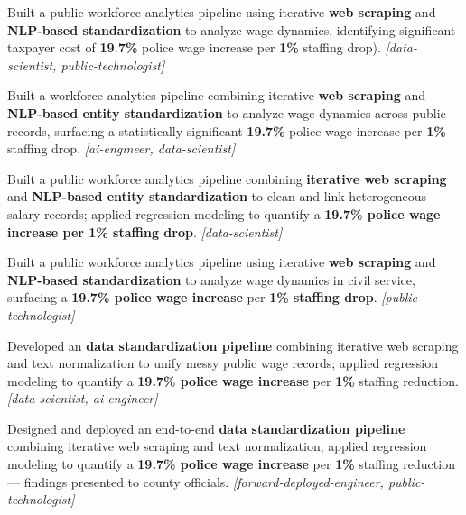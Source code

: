 \documentclass[letterpaper,11pt]{article}
\newcommand{\resumeItem}[1]{
  \item\small{
    {#1 \vspace{-3pt}}
  }
}
\begin{document}
                \resumeItem{Built a public workforce analytics pipeline using iterative \textbf{web scraping} and \textbf{NLP-based standardization} to analyze wage dynamics, identifying significant taxpayer cost of \textbf{19.7\%} police wage increase per \textbf{1\%} staffing drop). \textit{[data-scientist, public-technologist]}}
                \resumeItem{Built a workforce analytics pipeline combining iterative \textbf{web scraping} and \textbf{NLP-based entity standardization} to analyze wage dynamics across public records, surfacing a statistically significant \textbf{19.7\%} police wage increase per \textbf{1\%} staffing drop. \textit{[ai-engineer, data-scientist]}}
                \resumeItem{Built a public workforce analytics pipeline combining \textbf{iterative web scraping} and \textbf{NLP-based entity standardization} to clean and link heterogeneous salary records; applied regression modeling to quantify a \textbf{19.7\% police wage increase per 1\% staffing drop}. \textit{[data-scientist]}}
                \resumeItem{Built a public workforce analytics pipeline using iterative \textbf{web scraping} and \textbf{NLP-based standardization} to analyze wage dynamics in civil service, surfacing a \textbf{19.7\% police wage increase} per \textbf{1\% staffing drop}. \textit{[public-technologist]}}
                \resumeItem{Developed an \textbf{data standardization pipeline} combining iterative web scraping and text normalization to unify messy public wage records; applied regression modeling to quantify a \textbf{19.7\% police wage increase} per \textbf{1\%} staffing reduction. \textit{[data-scientist, ai-engineer]}}
                \resumeItem{Designed and deployed an end-to-end \textbf{data standardization pipeline} combining iterative web scraping and text normalization; applied regression modeling to quantify a \textbf{19.7\% police wage increase} per \textbf{1\%} staffing reduction --- findings presented to county officials. \textit{[forward-deployed-engineer, public-technologist]}}
\end{document}
